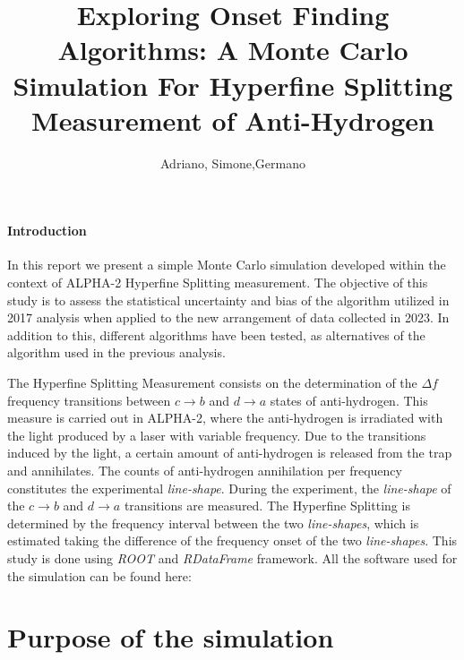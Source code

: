 \documentclass[11pt,a4paper,oneside]{article}
\title{%
 \vspace{-2.0cm}
 Exploring Onset Finding Algorithms: A Monte Carlo \\ Simulation For  Hyperfine Splitting Measurement of Anti-Hydrogen
}
\date{\vspace{-5ex}}
\author{Adriano, Simone,Germano }
\begin{document}

\maketitle


\paragraph{Introduction}

In this report we present a simple Monte Carlo simulation developed within the context of ALPHA-2 Hyperfine Splitting measurement. The objective of this study is to assess the statistical uncertainty and bias of the algorithm utilized in 2017 analysis when applied to the new arrangement of data collected in 2023. In addition to this, different algorithms have been tested, as alternatives of the algorithm used in the previous analysis.

The Hyperfine Splitting Measurement consists on the determination of the $\Delta f$ frequency transitions between $c \rightarrow b$ and $ d \rightarrow a$ states of anti-hydrogen. This measure is carried out in ALPHA-2, where the anti-hydrogen is irradiated with the light produced by a laser with variable frequency. Due to the transitions induced by the light, a certain amount of anti-hydrogen is released from the trap and annihilates. The counts of anti-hydrogen annihilation per frequency constitutes the experimental \textit{line-shape}. During the experiment, the \textit{line-shape} of the $c \rightarrow b$ and $ d \rightarrow a$ transitions are measured. The Hyperfine Splitting is determined by the frequency interval between the two \textit{line-shapes}, which is estimated taking the difference of the frequency onset of the two \textit{line-shapes}. This study is done using \textit{ROOT} and \textit{RDataFrame} framework. All the software used for the simulation can be found here: {}

\section{Purpose of the simulation}
\end{document}
